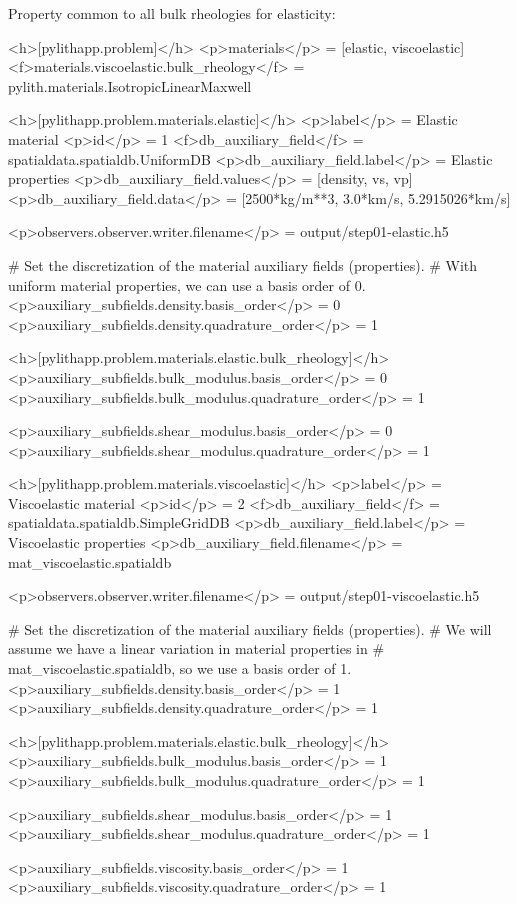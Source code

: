 Property common to all bulk rheologies for elasticity:
\begin{inventory}
\end{inventory}

\begin{cfg}
<h>[pylithapp.problem]</h>
<p>materials</p> = [elastic, viscoelastic]
<f>materials.viscoelastic.bulk_rheology</f> = pylith.materials.IsotropicLinearMaxwell

<h>[pylithapp.problem.materials.elastic]</h>
<p>label</p> = Elastic material
<p>id</p> = 1
<f>db_auxiliary_field</f> = spatialdata.spatialdb.UniformDB
<p>db_auxiliary_field.label</p> = Elastic properties
<p>db_auxiliary_field.values</p> = [density, vs, vp]
<p>db_auxiliary_field.data</p> = [2500*kg/m**3, 3.0*km/s, 5.2915026*km/s]

<p>observers.observer.writer.filename</p> = output/step01-elastic.h5

# Set the discretization of the material auxiliary fields (properties).
# With uniform material properties, we can use a basis order of 0.
<p>auxiliary_subfields.density.basis_order</p> = 0
<p>auxiliary_subfields.density.quadrature_order</p> = 1

<h>[pylithapp.problem.materials.elastic.bulk_rheology]</h>
<p>auxiliary_subfields.bulk_modulus.basis_order</p> = 0
<p>auxiliary_subfields.bulk_modulus.quadrature_order</p> = 1

<p>auxiliary_subfields.shear_modulus.basis_order</p> = 0
<p>auxiliary_subfields.shear_modulus.quadrature_order</p> = 1


<h>[pylithapp.problem.materials.viscoelastic]</h>
<p>label</p> = Viscoelastic material
<p>id</p> = 2
<f>db_auxiliary_field</f> = spatialdata.spatialdb.SimpleGridDB
<p>db_auxiliary_field.label</p> = Viscoelastic properties
<p>db_auxiliary_field.filename</p> = mat_viscoelastic.spatialdb

<p>observers.observer.writer.filename</p> = output/step01-viscoelastic.h5

# Set the discretization of the material auxiliary fields (properties).
# We will assume we have a linear variation in material properties in
# mat_viscoelastic.spatialdb, so we use a basis order of 1.
<p>auxiliary_subfields.density.basis_order</p> = 1
<p>auxiliary_subfields.density.quadrature_order</p> = 1

<h>[pylithapp.problem.materials.elastic.bulk_rheology]</h>
<p>auxiliary_subfields.bulk_modulus.basis_order</p> = 1
<p>auxiliary_subfields.bulk_modulus.quadrature_order</p> = 1

<p>auxiliary_subfields.shear_modulus.basis_order</p> = 1
<p>auxiliary_subfields.shear_modulus.quadrature_order</p> = 1

<p>auxiliary_subfields.viscosity.basis_order</p> = 1
<p>auxiliary_subfields.viscosity.quadrature_order</p> = 1
\end{cfg}


